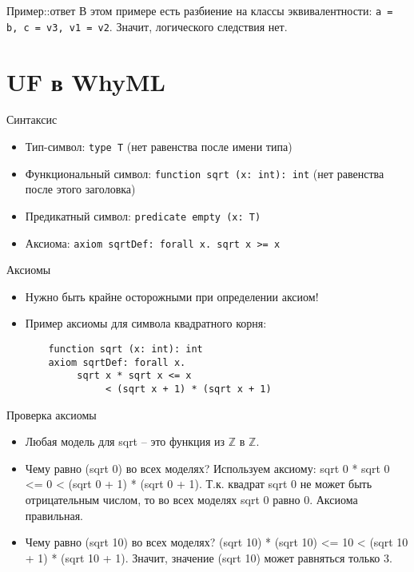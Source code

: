 \documentclass[hyperref={unicode=true}]{beamer}
\begin{document}
    \begin{frame}{Пример::ответ}
    В этом примере есть разбиение на классы эквивалентности:
    \texttt{a = b, c = v3, v1 = v2}. Значит, логического
    следствия нет.
    \end{frame}

    \section{UF в WhyML}

    \begin{frame}{Синтаксис}
    \begin{itemize}
    \item
    Тип-символ: \texttt{type T} (нет равенства после имени типа)
    \item
    Функциональный символ: \texttt{function sqrt (x: int): int}
    (нет равенства после этого заголовка)
    \item
    Предикатный символ: \texttt{predicate empty (x: T)}
    \item
    Аксиома: \texttt{axiom sqrtDef: forall x. sqrt x >= x}
    \end{itemize}
    \end{frame}

    \begin{frame}[fragile]{Аксиомы}
    \begin{itemize}
    \item
    Нужно быть крайне осторожными при определении аксиом!
    \item
    Пример аксиомы для символа квадратного корня:
    \begin{lstlisting}
    function sqrt (x: int): int
    axiom sqrtDef: forall x.
         sqrt x * sqrt x <= x
              < (sqrt x + 1) * (sqrt x + 1)
    \end{lstlisting}
    \end{itemize}
    \end{frame}

    \begin{frame}{Проверка аксиомы}
    \begin{itemize}
    \item
    Любая модель для sqrt -- это функция из $\mathbb{Z}$ в $\mathbb{Z}$.
    \item
    Чему равно (sqrt 0) во всех моделях? Используем аксиому:
    sqrt 0 * sqrt 0 <= 0 < (sqrt 0 + 1) * (sqrt 0 + 1).
    Т.к. квадрат sqrt 0 не может быть отрицательным числом, то
    во всех моделях sqrt 0 равно 0. Аксиома правильная.
    \item
    Чему равно (sqrt 10) во всех моделях?
    (sqrt 10) * (sqrt 10) <= 10 < (sqrt 10 + 1) * (sqrt 10 + 1).
    Значит, значение (sqrt 10) может равняться только 3.
    \end{itemize}
    \end{frame}
\end{document}
